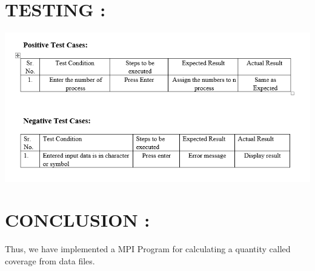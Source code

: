 \documentclass[10pt,a4paper]{article}
\begin{document}
\section{TESTING :}
\includegraphics[scale=0.75]{MPI_07}

			
\section{CONCLUSION : }
	Thus, we have implemented a MPI Program for calculating a quantity called coverage from data files.
\end{document}
